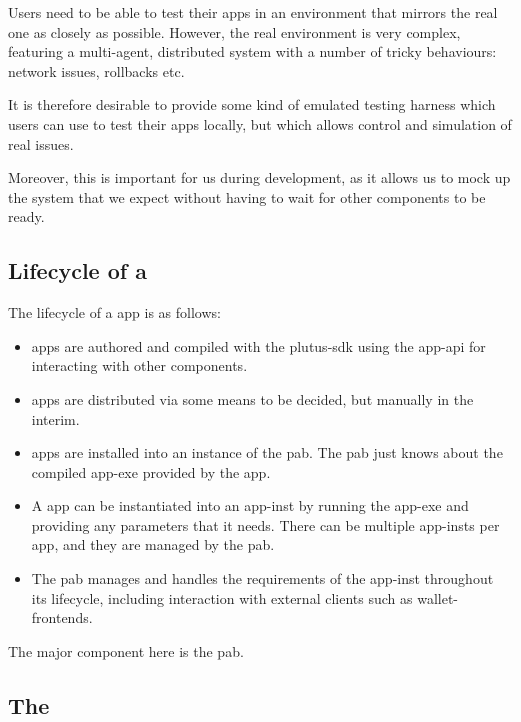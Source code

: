 \begin{requirement}
\label{req:app-emulation}
Users need to be able to test their \glspl{app} in an environment that mirrors the real one as closely as possible.
However, the real environment is very complex, featuring a multi-agent, distributed system with a number of tricky behaviours: network issues, rollbacks etc.

It is therefore desirable to provide some kind of emulated testing harness which users can use to test their \glspl{app} locally, but which allows control and simulation of real issues.

Moreover, this is important for us during development, as it allows us to mock up the system that we expect without having to wait for other components to be ready.
\end{requirement}

\subsection{Lifecycle of a }

The lifecycle of a \gls{app} is as follows:

\begin{itemize}
\item
  \Glspl{app} are authored and compiled with the \gls{plutus-sdk} using the \gls{app-api} for interacting with other components.
\item
  \Glspl{app} are distributed via some means to be decided, but manually in the interim.
\item
  \Glspl{app} are installed into an instance of the \gls{pab}. The \gls{pab} just knows about the compiled \gls{app-exe} provided by the \gls{app}.
\item
  A \gls{app} can be instantiated into an \gls{app-inst} by running the \gls{app-exe} and providing any parameters that it needs.
  There can be multiple \glspl{app-inst} per \gls{app}, and they are managed by the \gls{pab}.
\item
  The \gls{pab} manages and handles the requirements of the \gls{app-inst} throughout its lifecycle, including interaction with external clients such as \glspl{wallet-frontend}.
\end{itemize}

The major component here is the \gls{pab}.

\subsection{The }
\label{sec:pab}

